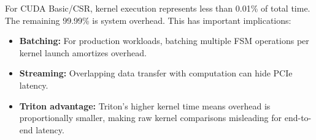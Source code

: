 For CUDA Basic/CSR, kernel execution represents less than 0.01\% of total time. The remaining 99.99\% is system overhead. This has important implications:
\begin{itemize}
    \item \textbf{Batching:} For production workloads, batching multiple FSM operations per kernel launch amortizes overhead.
    \item \textbf{Streaming:} Overlapping data transfer with computation can hide PCIe latency.
    \item \textbf{Triton advantage:} Triton's higher kernel time means overhead is proportionally smaller, making raw kernel comparisons misleading for end-to-end latency.
\end{itemize}
